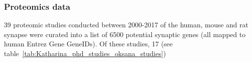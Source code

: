   




\subsubsection{Proteomics data}
\label{sec:proteomics data}
39 proteomic studies conducted between 2000-2017 of the human, mouse and rat synapse were curated into a list of 6500
potential synaptic genes (all mapped to human Entrez Gene GeneIDs)\cite{heil2018systems}\cite{maglott2005entrez}.  Of these studies, 17 (see table~\ref{tab:Katharina_phd_studies_oksana_studies})

